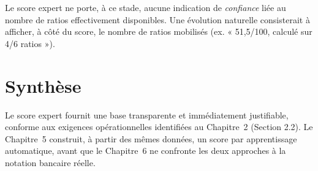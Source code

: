 \begin{limite}
Le score expert ne porte, à ce stade, aucune indication de \emph{confiance} liée au nombre de
ratios effectivement disponibles. Une évolution naturelle consisterait à afficher, à côté du
score, le nombre de ratios mobilisés (ex. « 51,5/100, calculé sur 4/6 ratios »).
\end{limite}

\section{Synthèse}

Le score expert fournit une base transparente et immédiatement justifiable, conforme aux
exigences opérationnelles identifiées au Chapitre~2 (Section 2.2). Le Chapitre~5 construit, à
partir des mêmes données, un score par apprentissage automatique, avant que le Chapitre~6 ne
confronte les deux approches à la notation bancaire réelle.
